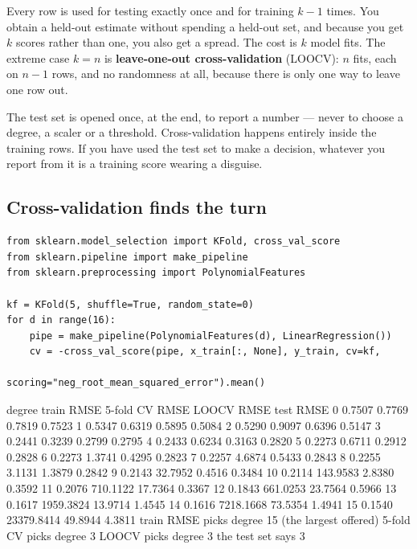 \documentclass[11pt]{article}
\begin{document}
Every row is used for testing exactly once and for training $k-1$ times. You
obtain a held-out estimate without spending a held-out set, and because you get
$k$ scores rather than one, you also get a spread. The cost is $k$ model fits.
The extreme case $k = n$ is \textbf{leave-one-out cross-validation} (LOOCV):
$n$ fits, each on $n-1$ rows, and no randomness at all, because there is only
one way to leave one row out.

\begin{caution}
The test set is opened once, at the end, to report a number --- never to choose
a degree, a scaler or a threshold. Cross-validation happens entirely inside the
training rows. If you have used the test set to make a decision, whatever you
report from it is a training score wearing a disguise.
\end{caution}

\subsection{Cross-validation finds the turn}
\label{sec:cvdetect}

\begin{lstlisting}
from sklearn.model_selection import KFold, cross_val_score
from sklearn.pipeline import make_pipeline
from sklearn.preprocessing import PolynomialFeatures

kf = KFold(5, shuffle=True, random_state=0)
for d in range(16):
    pipe = make_pipeline(PolynomialFeatures(d), LinearRegression())
    cv = -cross_val_score(pipe, x_train[:, None], y_train, cv=kf,
                          scoring="neg_root_mean_squared_error").mean()
\end{lstlisting}
\begin{codeout}
degree   train RMSE   5-fold CV RMSE   LOOCV RMSE     test RMSE
   0      0.7507          0.7769        0.7819        0.7523
   1      0.5347          0.6319        0.5895        0.5084
   2      0.5290          0.9097        0.6396        0.5147
   3      0.2441          0.3239        0.2799        0.2795
   4      0.2433          0.6234        0.3163        0.2820
   5      0.2273          0.6711        0.2912        0.2828
   6      0.2273          1.3741        0.4295        0.2823
   7      0.2257          4.6874        0.5433        0.2843
   8      0.2255          3.1131        1.3879        0.2842
   9      0.2143         32.7952        0.4516        0.3484
  10      0.2114        143.9583        2.8380        0.3592
  11      0.2076        710.1122       17.7364        0.3367
  12      0.1843        661.0253       23.7564        0.5966
  13      0.1617       1959.3824       13.9714        1.4545
  14      0.1616       7218.1668       73.5354        1.4941
  15      0.1540      23379.8414       49.8944        4.3811
train RMSE picks degree 15 (the largest offered)
5-fold CV  picks degree 3
LOOCV      picks degree 3
the test set says       3
\end{codeout}
\end{document}
